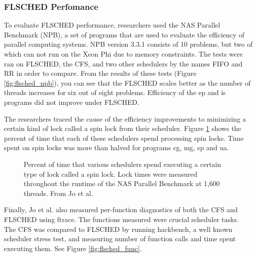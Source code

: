 \documentclass{sig-alternate}
\begin{document}

\subsubsection{FLSCHED Perfomance}
\label{sec:flsched_performance}

To evaluate FLSCHED performance, researchers used the NAS Parallel Benchmark (NPB), a set of programs that are used to evaluate the efficiency of parallel computing systems. NPB version 3.3.1 consists of 10 problems, but two of which can not run on the Xeon Phi due to memory constraints. The tests were ran on FLSCHED, the CFS, and two other schedulers by the names FIFO and RR in order to compare. From the results of these tests (Figure \ref{fig:flsched_npb}), you can see that the FLSCHED scales better as the number of threads increases for six out of eight problems. Efficiency of the ep and is programs did not improve under FLSCHED. \cite{JoEtal:2017}

\begin{figure*}
\centering
{}
\caption{FLSCHED performance comparison of various schedulers on programs in the NAS Parallel Benchmark. From Jo et al.~\cite{JoEtal:2017}}
\label{fig:flsched_npb}
\end{figure*}


The researchers traced the cause of the efficiency improvements to minimizing a certain kind of lock called a spin lock from their scheduler. Figure \ref{fig:flsched_spinlock} shows the percent of time that each of these schedulers spend processing spin locks. Time spent on spin locks was more than halved for programs cg, mg, sp and ua. \cite{JoEtal:2017}

\begin{figure}
\centering
{}
\caption{ Percent of time that various schedulers spend executing a certain type of lock called a spin lock. Lock times were measured throughout the runtime of the NAS Parallel Benchmark at 1,600 threads. From Jo et al.~\cite{JoEtal:2017}}
\label{fig:flsched_spinlock}
\end{figure}

Finally, Jo et al. also measured per-function diagnostics of both the CFS and FLSCHED using ftrace. The functions measured were crucial scheduler tasks. The CFS was compared to FLSCHED by running hackbench, a well known scheduler stress test, and measuring number of function calls and time spent executing them. See Figure \ref{fig:flsched_func}.\cite{JoEtal:2017}
\end{document}
